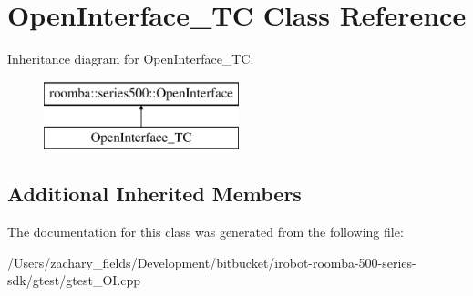 \hypertarget{class_open_interface___t_c}{\section{Open\+Interface\+\_\+\+T\+C Class Reference}
\label{class_open_interface___t_c}
}
Inheritance diagram for Open\+Interface\+\_\+\+T\+C\+:\begin{figure}[H]
\begin{center}
\leavevmode
\includegraphics[height=2.000000cm]{class_open_interface___t_c}
\end{center}
\end{figure}
\subsection*{Additional Inherited Members}


The documentation for this class was generated from the following file\+:\begin{DoxyCompactItemize}
\item 
/\+Users/zachary\+\_\+fields/\+Development/bitbucket/irobot-\/roomba-\/500-\/series-\/sdk/gtest/gtest\+\_\+\+O\+I.\+cpp\end{DoxyCompactItemize}

